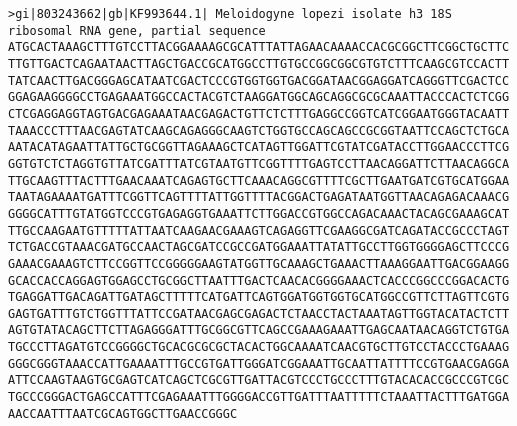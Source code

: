 \documentclass[11pt]{article}
\begin{document}
\begin{Verbatim}[commandchars=\\\{\}]
>gi|803243662|gb|KF993644.1| Meloidogyne lopezi isolate h3 18S ribosomal RNA gene, partial sequence
ATGCACTAAAGCTTTGTCCTTACGGAAAAGCGCATTTATTAGAACAAAACCACGCGGCTTCGGCTGCTTC
TTGTTGACTCAGAATAACTTAGCTGACCGCATGGCCTTGTGCCGGCGGCGTGTCTTTCAAGCGTCCACTT
TATCAACTTGACGGGAGCATAATCGACTCCCGTGGTGGTGACGGATAACGGAGGATCAGGGTTCGACTCC
GGAGAAGGGGCCTGAGAAATGGCCACTACGTCTAAGGATGGCAGCAGGCGCGCAAATTACCCACTCTCGG
CTCGAGGAGGTAGTGACGAGAAATAACGAGACTGTTCTCTTTGAGGCCGGTCATCGGAATGGGTACAATT
TAAACCCTTTAACGAGTATCAAGCAGAGGGCAAGTCTGGTGCCAGCAGCCGCGGTAATTCCAGCTCTGCA
AATACATAGAATTATTGCTGCGGTTAGAAAGCTCATAGTTGGATTCGTATCGATACCTTGGAACCCTTCG
GGTGTCTCTAGGTGTTATCGATTTATCGTAATGTTCGGTTTTGAGTCCTTAACAGGATTCTTAACAGGCA
TTGCAAGTTTACTTTGAACAAATCAGAGTGCTTCAAACAGGCGTTTTCGCTTGAATGATCGTGCATGGAA
TAATAGAAAATGATTTCGGTTCAGTTTTATTGGTTTTACGGACTGAGATAATGGTTAACAGAGACAAACG
GGGGCATTTGTATGGTCCCGTGAGAGGTGAAATTCTTGGACCGTGGCCAGACAAACTACAGCGAAAGCAT
TTGCCAAGAATGTTTTTATTAATCAAGAACGAAAGTCAGAGGTTCGAAGGCGATCAGATACCGCCCTAGT
TCTGACCGTAAACGATGCCAACTAGCGATCCGCCGATGGAAATTATATTGCCTTGGTGGGGAGCTTCCCG
GAAACGAAAGTCTTCCGGTTCCGGGGGAAGTATGGTTGCAAAGCTGAAACTTAAAGGAATTGACGGAAGG
GCACCACCAGGAGTGGAGCCTGCGGCTTAATTTGACTCAACACGGGGAAACTCACCCGGCCCGGACACTG
TGAGGATTGACAGATTGATAGCTTTTTCATGATTCAGTGGATGGTGGTGCATGGCCGTTCTTAGTTCGTG
GAGTGATTTGTCTGGTTTATTCCGATAACGAGCGAGACTCTAACCTACTAAATAGTTGGTACATACTCTT
AGTGTATACAGCTTCTTAGAGGGATTTGCGGCGTTCAGCCGAAAGAAATTGAGCAATAACAGGTCTGTGA
TGCCCTTAGATGTCCGGGGCTGCACGCGCGCTACACTGGCAAAATCAACGTGCTTGTCCTACCCTGAAAG
GGGCGGGTAAACCATTGAAAATTTGCCGTGATTGGGATCGGAAATTGCAATTATTTTCCGTGAACGAGGA
ATTCCAAGTAAGTGCGAGTCATCAGCTCGCGTTGATTACGTCCCTGCCCTTTGTACACACCGCCCGTCGC
TGCCCGGGACTGAGCCATTTCGAGAAATTTGGGGACCGTTGATTTAATTTTTCTAAATTACTTTGATGGA
AACCAATTTAATCGCAGTGGCTTGAACCGGGC


\end{Verbatim}
\end{document}
